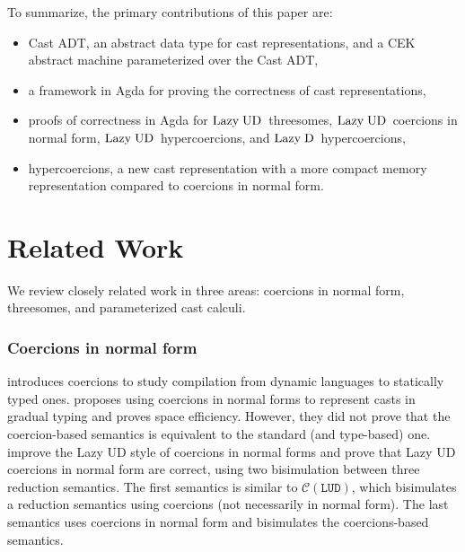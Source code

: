 \documentclass[runningheads]{llncs}
\newcommand{\LUD}{\ensuremath{\text{Lazy\;UD}}}
\newcommand{\LD}{\ensuremath{\text{Lazy\;D}}}
\newcommand{\CMachine}[1]{\ensuremath{\mathcal{C}(#1)}}
\newcommand{\LUDMachine}{\CMachine{\BLUD}}
\newcommand{\BLUD}[0]{\ensuremath{\mathtt{LUD}}}
\begin{document}
To summarize, the primary contributions of this paper are:
\begin{itemize}
\item Cast ADT, an abstract data type for cast representations, and a
  CEK abstract machine parameterized over the Cast ADT,
\item a framework in Agda for proving the correctness of cast
  representations,
\item proofs of correctness in Agda for \LUD\ threesomes,
  \LUD\ coercions in normal form, \LUD\ hypercoercions, and
  \LD\ hypercoercions, 
\item hypercoercions, a new cast representation with a more compact
  memory representation compared to coercions in normal form.
\end{itemize}


\section{Related Work}
\label{chap:related-works}


We review closely related work in three areas: coercions in normal
form, threesomes, and parameterized cast calculi.

\subsubsection{Coercions in normal form}

\citet{henglein1994dynamic} introduces coercions to study compilation
from dynamic languages to statically typed
ones. \citet{herman2010space} proposes using coercions in normal forms
to represent casts in gradual typing and proves space efficiency.
However, they did not prove that the coercion-based semantics is
equivalent to the standard (and type-based)
one. \citet{Siek:2015:BCT:2737924.2737968} improve the Lazy UD style
of coercions in normal forms and prove that Lazy UD coercions in
normal form are correct, using two bisimulation between three
reduction semantics. The first semantics is similar to \LUDMachine,
which bisimulates a reduction semantics using coercions (not
necessarily in normal form). The last semantics uses coercions in
normal form and bisimulates the coercions-based semantics.
\end{document}
